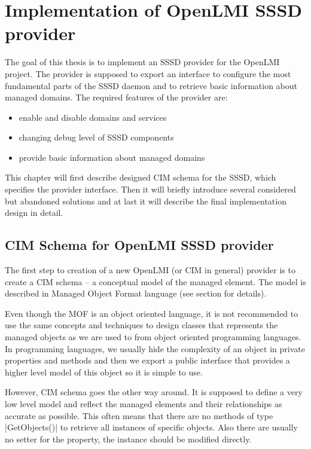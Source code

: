 \chapter{Implementation of OpenLMI SSSD provider}

The goal of this thesis is to implement an SSSD provider for the OpenLMI
project. The provider is supposed to export an interface to configure the most
fundamental parts of the SSSD daemon and to retrieve basic information about
managed domains. The required features of the provider are:

\begin{itemize}
  \item enable and disable domains and services
  \item changing debug level of SSSD components
  \item provide basic information about managed domains
\end{itemize}

This chapter will first describe designed CIM schema for the SSSD, which
specifies the provider interface. Then it will briefly introduce several
considered but abandoned solutions and at last it will describe the final
implementation design in detail.

\section{CIM Schema for OpenLMI SSSD provider}

The first step to creation of a new OpenLMI (or CIM in general) provider is to
create a CIM schema -- a conceptual model of the managed element. The model is
described in Managed Object Format language (see section 
for details).

Even though the MOF is an object oriented language, it is not recommended to use
the same concepts and techniques to design classes that represents the managed
objects as we are used to from object oriented programming languages. In
programming languages, we usually hide the complexity of an object in private
properties and methods and then we export a public interface that provides a
higher level model of this object so it is simple to use.

However, CIM schema goes the other way around. It is supposed to define a very
low level model and reflect the managed elements and their relationships as
accurate as possible. This often means that there are no methods of type
|GetObjects()| to retrieve all instances of specific objects. Also there are
usually no setter for the property, the instance should be modified directly.

